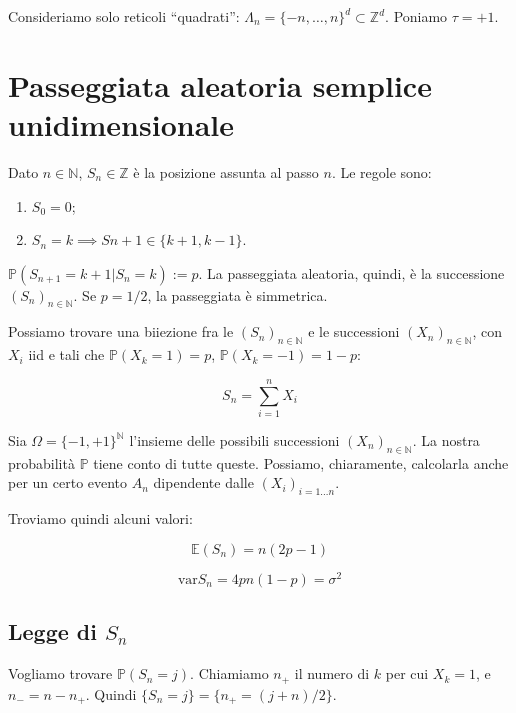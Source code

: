 \documentclass[12pt,a4paper]{article}
\numberwithin{equation}{section}
\theoremstyle{definition}
\theoremstyle{remark}
\begin{document}
Consideriamo solo reticoli ``quadrati'': $\Lambda_n = \lbrace -n, \dots, n \rbrace ^d \subset \mathbb{Z}^d$. Poniamo $\tau = +1$.

\section{Passeggiata aleatoria semplice unidimensionale}

Dato $n \in \mathbb{N}$,  $S_n \in \mathbb{Z}$ è la posizione assunta al passo $n$. Le regole sono:

\begin{enumerate}
\item $S_0 = 0$;
\item $S_n = k \implies S{n+1} \in \lbrace k+1, k-1 \rbrace$.
\end{enumerate}

$\mathbb{P} (S_{n+1} = k+1 | S_n = k) := p$. La passeggiata aleatoria, quindi, è la successione $(S_n)_{n\in \mathbb{N}}$. Se $p=1/2$, la passeggiata è simmetrica.

Possiamo trovare una biiezione fra le $(S_n)_{n \in \mathbb{N}}$ e le successioni $(X_n)_{n \in \mathbb{N}}$, con $X_i$ iid e tali che $\mathbb{P}(X_k = 1) = p$, $\mathbb{P}(X_k = -1) = 1-p$:

\begin{equation}
S_n = \sum_{i=1}^n X_i
\end{equation}

Sia $\Omega = \lbrace -1, +1 \rbrace ^\mathbb{N}$ l'insieme delle possibili successioni $( X_n )_{n\in \mathbb{N}}$. La nostra probabilità $\mathbb{P}$ tiene conto di tutte queste. Possiamo, chiaramente, calcolarla anche per un certo evento $A_n$ dipendente dalle $(X_i)_{i=1\dots n}$.

Troviamo quindi alcuni valori:

\begin{equation}
\mathbb{E}(S_n) = n (2p -1)
\end{equation}

\begin{equation}
\text{var} S_n = 4pn (1-p) = \sigma^2
\end{equation}

\subsection{Legge di $S_n$}

Vogliamo trovare $\mathbb{P}(S_n = j)$. Chiamiamo $n_+$ il numero di $k$ per cui $X_k=1$, e $n_- = n - n_+$. Quindi $\lbrace S_n = j \rbrace = \lbrace n_+ = (j+n)/2 \rbrace $.
\end{document}
